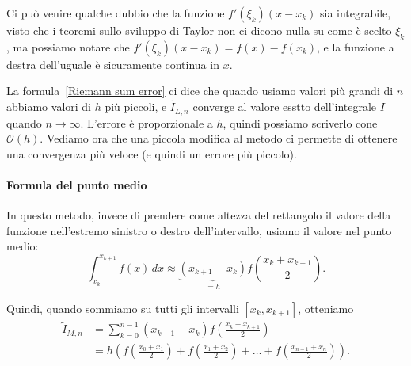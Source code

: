 \documentclass[a4paper]{report}
\theoremstyle{definiton}
\theoremstyle{remark}
\newcommand{\x}{\mathbf{x}}
\begin{document}
Ci può venire qualche dubbio che la funzione $f'(\xi_k)(x - x_k)$ sia integrabile, visto che i teoremi sullo sviluppo di Taylor non ci dicono nulla su come è scelto $\xi_k$, ma possiamo notare che $f'(\xi_k)(x - x_k) = f(x) - f(x_k)$, e la funzione a destra dell'uguale è sicuramente continua in $x$.

La formula~\eqref{Riemann sum error} ci dice che quando usiamo valori più grandi di $n$ abbiamo valori di $h$ più piccoli, e $\tilde{I}_{L,n}$ converge al valore esstto dell'integrale $I$ quando $n\to \infty$. L'errore è proporzionale a $h$, quindi possiamo scriverlo cone $\mathcal{O}(h)$. Vediamo ora che una piccola modifica al metodo ci permette di ottenere una convergenza più veloce (e quindi un errore più piccolo).

\paragraph{Formula del punto medio}
In questo metodo, invece di prendere come altezza del rettangolo il valore della funzione nell'estremo sinistro o destro dell'intervallo, usiamo il valore nel punto medio:
\begin{equation} \label{formula del punto medio}
    \int_{x_k}^{x_{k+1}} f(x) \, dx \approx \underbrace{(x_{k+1}-x_k)}_{=h} f\left(\frac{x_k + x_{k+1}}{2}\right).    
\end{equation}
\begin{center}
\end{center}

Quindi, quando sommiamo su tutti gli intervalli $[x_k,x_{k+1}]$, otteniamo
\begin{align*}
\tilde{I}_{M,n} &= \sum_{k=0}^{n-1} (x_{k+1}-x_k) f\left(\frac{x_k + x_{k+1}}{2}\right) \\
&= h \left(f\left(\frac{x_0 + x_{1}}{2}\right) + f\left(\frac{x_1 + x_{2}}{2}\right) + \dots + f\left(\frac{x_{n-1} + x_{n}}{2}\right)\right).
\end{align*}
\end{document}

